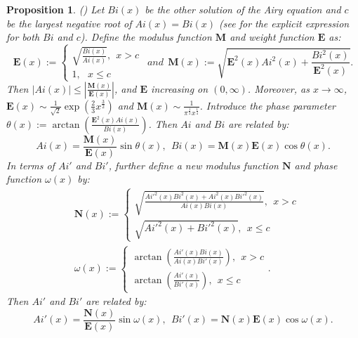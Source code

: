 \documentclass[11pt]{article}
\newtheorem{proposition}[theorem]{Proposition}
\numberwithin{equation}{section}%
\numberwithin{theorem}{section}
\begin{document}
\begin{proposition}\label{aux4AiandBi}
    (\cite[Section $11.2$]{olver1997asymptotics}) Let $Bi(x)$ be the other solution of the Airy equation and $c$ be the largest negative root of $Ai(x)=Bi(x)$ (see \cite[Section $11.2.2$]{olver1997asymptotics} for the explicit expression for both $Bi$ and $c$). Define the modulus function $\mathbf{M}$ and weight function $\mathbf{E}$ as:
    \begin{equation*}
        \mathbf{E}(x):=\left\{\begin{array}{cc}
\sqrt{\frac{Bi(x)}{Ai(x)}},~~x>c\\
1,~~~x\le c
        \end{array}\right.~~and~~ \mathbf{M}(x):=\sqrt{\mathbf{E}^2(x)Ai^2(x)+\frac{Bi^2(x)}{\mathbf{E}^2(x)}}.
    \end{equation*}
    Then $|Ai(x)|\le\left|\frac{\mathbf{M}(x)}{\mathbf{E}(x)}\right|$, and $\mathbf{E}$ increasing on $(0,\infty)$. Moreover, as $x\rightarrow\infty$,  $\mathbf{E}(x)\sim\frac{1}{\sqrt2}\exp\left(\frac{2}{3}x^\frac{3}{2}\right)$ and $\mathbf{M}(x)\sim\frac{1}{\pi^\frac{1}{2}x^\frac{1}{4}}$. Introduce the phase parameter $\theta(x):=\arctan\left(\frac{\mathbf{E}^2(x)Ai(x)}{Bi(x)}\right)$. Then $Ai$ and $Bi$ are related by:
    \begin{equation}\label{MandEzero}
        Ai(x)=\frac{\mathbf{M}(x)}{\mathbf{E}(x)}\sin\theta(x),~~Bi(x)=\mathbf{M}(x)\mathbf{E}(x)\cos\theta(x).
    \end{equation}
    In terms of $Ai'$ and $Bi'$, further define a new modulus function $\mathbf{N}$ and phase function $\omega(x)$ by:
        \begin{equation*}
        \begin{split}
                   & \mathbf{N}(x):=\left\{\begin{array}{cc}
\sqrt{\frac{Ai'^2(x)Bi^2(x)+Ai^2(x)Bi'^2(x)}{Ai(x)Bi(x)}},~~x>c\\
\sqrt{Ai'^2(x)+Bi'^2(x)},~~x\le c
        \end{array}\right.\\&   \omega(x):=\left\{\begin{array}{cc}
           \arctan\left(\frac{Ai'(x)Bi(x)}{Ai(x)Bi'(x)}\right),~~x>c\\
           \arctan\left(\frac{Ai'(x)}{Bi'(x)}\right),~~x\le c
        \end{array}\right..
        \end{split}
    \end{equation*}
    Then $Ai'$ and $Bi'$ are related by:
    \begin{equation}\label{NandEfirst}
         Ai'(x)=\frac{\mathbf{N}(x)}{\mathbf{E}(x)}\sin\omega(x),~~Bi'(x)=\mathbf{N}(x)\mathbf{E}(x)\cos\omega(x).
    \end{equation}
\end{proposition}
\end{document}
